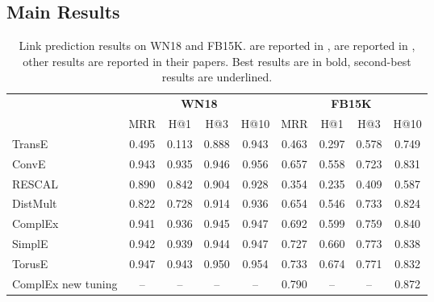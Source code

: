 \documentclass{ecai}
\theoremstyle{plain}  \newtheorem{thm}{Theorem}  \newtheorem{lem}[thm]{Lemma}  \newtheorem{prop}[thm]{Proposition}
\theoremstyle{remark}  \newtheorem*{rem}{Remark}
\begin{document}
\subsection{Main Results} \label{sect:result} \begin{table*}[ht]


	\caption[Link prediction results on WN18 and FB15K.]{Link prediction results on WN18 and FB15K.  are reported in \cite{nickel_holographicembeddingsknowledge_2016},  are reported in \cite{trouillon_complexembeddingssimple_2016}, other results are reported in their papers. Best results are in bold, second-best results are underlined.}
	\label{tab:result}
	\centering
	\begin{adjustbox}{max width=\textwidth}
		\begin{tabular}{@{\extracolsep{2pt}}lcccccccc@{}}
			
			\toprule
			
			& \multicolumn{4}{c}{\textbf{WN18}} & \multicolumn{4}{c}{\textbf{FB15K}} \\
			\cmidrule(lr){2-5} \cmidrule(lr){6-9}
			& MRR & H@1 & H@3 & H@10 & MRR & H@1 & H@3 & H@10 \\ 
			\hline
			
TransE \cite{bordes_translatingembeddingsmodeling_2013}  & 0.495 & 0.113 & 0.888 & 0.943 & 0.463 & 0.297 & 0.578 & 0.749 \\


ConvE \cite{dettmers_convolutional2dknowledge_2018} & 0.943 & 0.935 & 0.946 & 0.956 & 0.657 & 0.558 & 0.723 & 0.831 \\


RESCAL \cite{nickel_threewaymodelcollective_2011}  & 0.890 & 0.842 & 0.904 & 0.928 & 0.354 & 0.235 & 0.409 & 0.587 \\
DistMult \cite{yang_embeddingentitiesrelations_2015}  &  0.822 & 0.728 & 0.914 & 0.936 & 0.654 & 0.546 & 0.733 & 0.824 \\
			ComplEx \cite{trouillon_complexembeddingssimple_2016} & 0.941 & 0.936 & 0.945 & 0.947 & 0.692 & 0.599 & 0.759 & 0.840 \\
			SimplE \cite{kazemi_simpleembeddinglink_2018} & 0.942 & 0.939 & 0.944 & 0.947 & 0.727 & 0.660 & 0.773 & 0.838  \\  
			
TorusE \cite{ebisu_toruseknowledgegraph_2018} & 0.947 & 0.943 & 0.950 & 0.954 & 0.733 & 0.674 & 0.771 & 0.832 \\
			ComplEx new tuning \cite{lerer_pytorchbiggraphlargescalegraph_2019} & -- & -- & -- & -- & 0.790 & -- & -- & 0.872 \\  


\end{tabular}
\end{adjustbox}
\end{table*}
\end{document}
